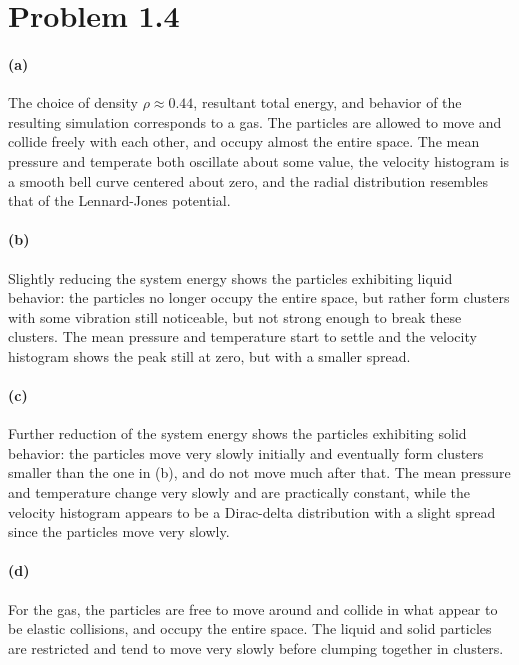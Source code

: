 \documentclass[12pt,a4paper,twocolumn]{article}
\begin{document}
\setcounter{page}{1}

\section*{Problem 1.4}

\paragraph{(a)}
The choice of density $\rho \approx 0.44$, resultant total energy, and behavior of the resulting simulation corresponds to a gas. The particles are allowed to move and collide freely with each other, and occupy almost the entire space. The mean pressure and temperate both oscillate about some value, the velocity histogram is a smooth bell curve centered about zero, and the radial distribution resembles that of the Lennard-Jones potential.

\paragraph{(b)}
Slightly reducing the system energy shows the particles exhibiting liquid behavior: the particles no longer occupy the entire space, but rather form clusters with some vibration still noticeable, but not strong enough to break these clusters. The mean pressure and temperature start to settle and the velocity histogram shows the peak still at zero, but with a smaller spread.

\paragraph{(c)}
Further reduction of the system energy shows the particles exhibiting solid behavior: the particles move very slowly initially and eventually form clusters smaller than the one in (b), and do not move much after that. The mean pressure and temperature change very slowly and are practically constant, while the velocity histogram appears to be a Dirac-delta distribution with a slight spread since the particles move very slowly.

\paragraph{(d)}
For the gas, the particles are free to move around and collide in what appear to be elastic collisions, and occupy the entire space. The liquid and solid particles are restricted and tend to move very slowly before clumping together in clusters.
\end{document}

